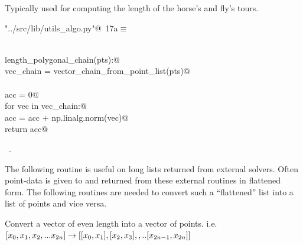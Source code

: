 \documentclass[11.5pt]{report}
\begin{document}
Typically used for computing the length of the horse's and fly's tours. 

\begin{flushleft} \small\label{scrap12}\raggedright\small
{} \verb@"../src/lib/utils_algo.py"@\nobreak\ {\footnotesize {17a}}$\equiv$
\vspace{-1ex}
\begin{list}{}{} \item
\mbox{}\verb@@\\
\mbox{}\verb@def length_polygonal_chain(pts):@\\
\mbox{}\verb@    vec_chain = vector_chain_from_point_list(pts)@\\
\mbox{}\verb@@\\
\mbox{}\verb@    acc = 0@\\
\mbox{}\verb@    for vec in vec_chain:@\\
\mbox{}\verb@        acc = acc + np.linalg.norm(vec)@\\
\mbox{}\verb@    return acc@\\
\mbox{}\verb@@{\NWsep}
\end{list}
\vspace{-1.5ex}
\footnotesize
\begin{list}{}{\setlength{\itemsep}{-\parsep}\setlength{\itemindent}{-\leftmargin}}
\item \NWtxtFileDefBy\ .

\item{}
\end{list}
\vspace{4ex}
\end{flushleft}
\newchunk The following routine is useful on long lists returned from external solvers. 
Often point-data is given to and returned from these external routines in flattened
form. The following routines are needed to convert such a ``flattened'' list into 
a list of points and vice versa. 

Convert a vector of even length into a vector of points. i.e. 
$[x_0,x_1,x_2,...x_{2n}] \rightarrow [[x_0,x_1],[x_2,x_3],,..[x_{2n-1},x_{2n}]]$
\end{document}
